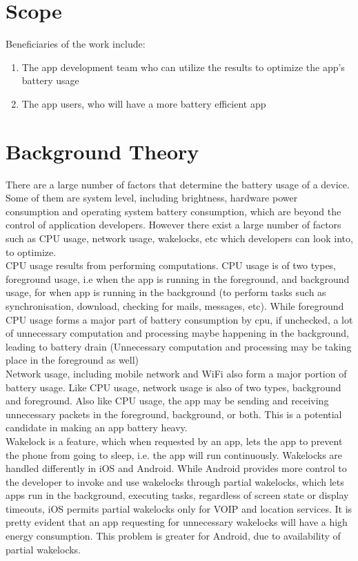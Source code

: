 \documentclass[a4paper,12pt]{article}
\begin{document}
\section{Scope}
Beneficiaries of the work include:
\begin{enumerate}
	\item The app development team who can utilize the results to optimize the app’s battery usage
	\item The app users, who will have a more battery efficient app
\end{enumerate}
\section{Background Theory}

There are a large number of factors that determine the battery usage of a device. Some of them are system level, including brightness, hardware power consumption and operating system battery consumption, which are beyond the control of application developers. However there exist a large number of factors such as CPU usage, network usage, wakelocks, etc which developers can look into, to optimize. \\

CPU usage results from performing computations. CPU usage is of two types, foreground usage, i.e when the app is running in the foreground, and background usage, for when app is running in the background (to perform tasks such as synchronisation, download, checking for mails, messages, etc). While foreground CPU usage forms a major part of battery consumption by cpu, if unchecked, a lot of unnecessary computation and processing maybe happening in the background, leading to battery drain (Unnecessary computation and processing may be taking place in the foreground as well) \\

Network usage, including mobile network and WiFi also form a major portion of battery usage. Like CPU usage, network usage is also of two types, background and foreground. Also like CPU usage, the app may be sending and receiving unnecessary packets in the foreground, background, or both. This is a potential candidate in making an app battery heavy.\\

Wakelock is a feature, which when requested by an app, lets the app to prevent the phone from going to sleep, i.e. the app will run continuously.\cite{wakelock} Wakelocks are handled differently in iOS and Android. While Android provides more control to the developer to invoke and use wakelocks through partial wakelocks, which lets apps run in the background, executing tasks, regardless of screen state or display timeouts, iOS permits partial wakelocks only for VOIP and location services.\cite{stackoverflow} It is pretty evident that an app requesting for unnecessary wakelocks will have a high energy consumption. This problem is greater for Android, due to availability of partial wakelocks.\\
\end{document}
